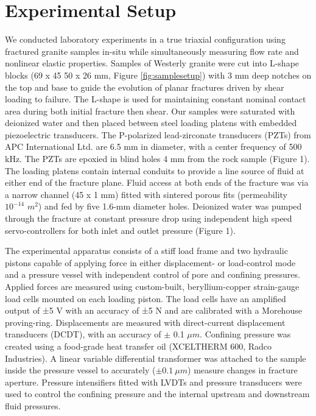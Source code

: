 \documentclass[draft]{agujournal2019}
\begin{document}

\section{Experimental Setup}
\label{sec:experimnt_setup}

We conducted laboratory experiments in a true triaxial configuration using fractured granite samples in-situ while simultaneously measuring flow rate and nonlinear elastic properties. Samples of Westerly granite were cut  into L-shape blocks (69 x 45 50 x 26 mm, Figure \ref{fig:samplesetup}) with 3 mm deep notches on the top and base to guide the evolution of planar fractures driven by shear loading to failure. The L-shape is used for maintaining constant nominal contact area during both initial fracture then shear. Our samples were saturated with deionized water and then placed between steel loading platens  with  embedded piezoelectric transducers. The P-polarized lead-zirconate transducers (PZTs) from APC International Ltd. are 6.5 mm in diameter, with a center frequency of 500 kHz. The PZTs are epoxied in blind holes 4 mm from the rock sample (Figure 1). The loading platens contain internal conduits to provide a line source of fluid at either end of the fracture plane. Fluid access at both ends of the fracture was via a narrow channel (45 x 1 mm) fitted with sintered porous fits (permeability ~ $10^{-14}$ $m^2$) and fed by five 1.6-mm diameter holes.  Deionized water was pumped through the fracture at constant pressure drop using independent high speed servo-controllers for both inlet and outlet pressure (Figure 1).

The experimental apparatus consists of a stiff load frame and two hydraulic pistons capable of applying force in either displacement- or load-control mode and a pressure vessel with independent control of pore and confining pressures. Applied forces are measured using custom-built, beryllium-copper strain-gauge load cells mounted on each loading piston. The load cells have an amplified output of ±5 V with an accuracy of ±5 N and are calibrated with a Morehouse proving-ring. Displacements are measured with direct-current displacement transducers (DCDT), with an accuracy of $\pm$ 0.1 $\mu m$. Confining pressure was created using a food-grade heat transfer oil (XCELTHERM 600, Radco Industries). A linear variable differential transformer was attached to the sample inside the pressure vessel to accurately ($\pm 0.1\ \mu m$) measure changes in fracture aperture. Pressure intensifiers fitted with LVDTs and pressure transducers were used to control the confining pressure and the internal upstream and downstream fluid pressures.
\end{document}
